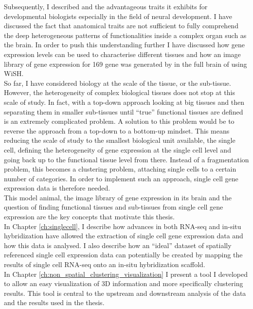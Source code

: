 	Subsequently, I described \platyfull{} and the advantageous traits it exhibits for developmental biologists especially in the field of neural development. I have discussed the fact that anatomical traits are not sufficient to fully comprehend the deep heterogeneous patterns of functionalities inside a complex organ such as the brain. In order to push this understanding further I have discussed how gene expression levels can be used to characterise different tissues and how an image library of gene expression for 169 gene was generated by \citep{Tomer10} in the full brain of \platy{} using WiSH.\\
	
	So far, I have considered biology at the scale of the tissue, or the sub-tissue. However, the heterogeneity of complex biological tissues does not stop at this scale of study. In fact, with a top-down approach looking at big tissues and then separating them in smaller sub-tissues until ``true'' functional tissues are defined is an extremely complicated problem. A solution to this problem would be to reverse the approach from a top-down to a bottom-up mindset. This means reducing the scale of study to the smallest biological unit available, the single cell, defining the heterogeneity of gene expression at the single cell level and going back up to the functional tissue level from there. Instead of a fragmentation problem, this becomes a clustering problem, attaching single cells to a certain number of categories. In order to implement such an approach, single cell gene expression data is therefore needed.\\
	
	This model animal, the image library of gene expression in its brain and the question of finding functional tissues and sub-tissues from single cell gene expression are the key concepts that motivate this thesis.\\
	
	In Chapter \ref{ch:singlecell}, I describe how advances in both RNA-seq and in-situ hybridization have allowed the extraction of single cell gene expression data and how this data is analysed. I also describe how an ``ideal'' dataset of spatially referenced single cell expression data can potentially be created by mapping the results of single cell RNA-seq onto an in-situ hybridization scaffold.\\
	
	In Chapter \ref{ch:non_spatial_clustering_visualization} I present a tool I developed to allow an easy visualization of 3D information and more specifically clustering results. This tool is central to the upstream and downstream analysis of the data and the results used in the thesis.\\
	

